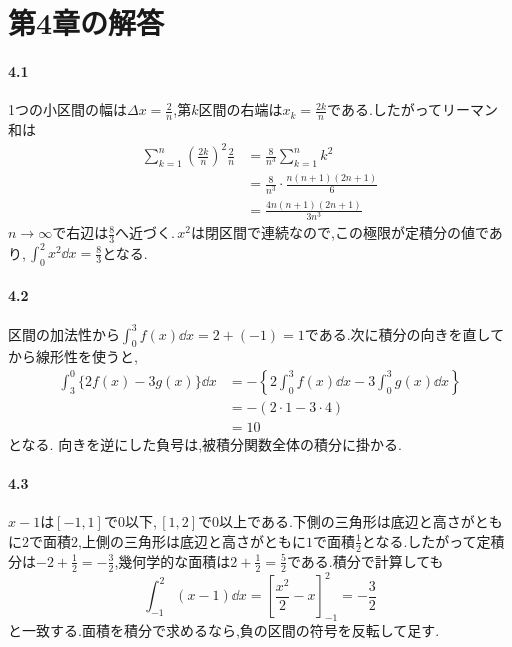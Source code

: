 \section{第4章の解答}\label{解答:第4章}

\paragraph{4.1}
1つの小区間の幅は$\Delta x=\frac2n$,第$k$区間の右端は$x_k=\frac{2k}{n}$である.したがってリーマン和は
\begin{align*}
 \sum_{k=1}^n\left(\frac{2k}{n}\right)^2\frac2n
 &=\frac8{n^3}\sum_{k=1}^nk^2\\
 &=\frac8{n^3}\cdot\frac{n(n+1)(2n+1)}{6}\\
 &=\frac{4n(n+1)(2n+1)}{3n^3}
\end{align*}
$n\to\infty$で右辺は$\frac83$へ近づく.\,$x^2$は閉区間で連続なので,この極限が定積分の値であり,\,$\int_0^2x^2\dd x=\frac83$となる.

\paragraph{4.2}
区間の加法性から$\int_0^3f(x)\dd x=2+(-1)=1$である.次に積分の向きを直してから線形性を使うと,
\begin{align*}
 \int_3^0\{2f(x)-3g(x)\}\dd x
 &=-\left\{2\int_0^3f(x)\dd x-3\int_0^3g(x)\dd x\right\}\\
 &=-(2\cdot1-3\cdot4)\\
 &=10
\end{align*}
となる.
向きを逆にした負号は,被積分関数全体の積分に掛かる.

\paragraph{4.3}
$x-1$は$[-1,1]$で$0$以下,\,$[1,2]$で$0$以上である.下側の三角形は底辺と高さがともに$2$で面積$2$,上側の三角形は底辺と高さがともに$1$で面積$\frac12$となる.したがって定積分は$-2+\frac12=-\frac32$,幾何学的な面積は$2+\frac12=\frac52$である.積分で計算しても
\[
 \int_{-1}^{2}(x-1)\dd x
 =\left[\frac{x^2}{2}-x\right]_{-1}^{2}=-\frac32
\]
と一致する.面積を積分で求めるなら,負の区間の符号を反転して足す.

